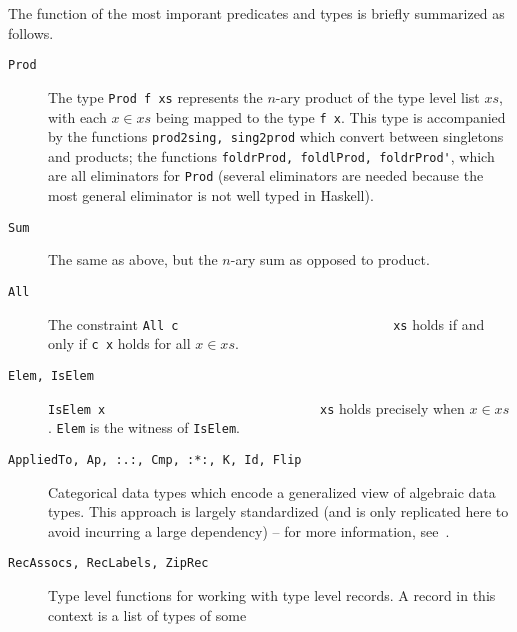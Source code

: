                         The function of the most imporant 
                        predicates and types is briefly summarized as follows. 
                        \begin{description}
                            \item[\texttt{Prod}] The type \lstinline{Prod f xs} 
                            represents the $n$-ary product of the type
                            level list $xs$, with each $x \in xs$ being mapped 
                            to the type \lstinline{f x}. This 
                            type is accompanied by the functions 
                            \lstinline{prod2sing, sing2prod} which convert
                            between singletons and products; the functions 
                            \lstinline{foldrProd, foldlProd, foldrProd'}, 
                            which are all eliminators for \lstinline{Prod} 
                            (several eliminators are needed because the 
                            most general eliminator is not well typed in 
                            Haskell). 
                            \item[\texttt{Sum}] The same as above, but the 
                            $n$-ary sum as opposed to product. 
                            \item[\texttt{All}] The constraint \lstinline{All c 
                            xs} holds if and only if \lstinline{c x} holds for 
                            all $x \in xs$. 
                            \item[\texttt{Elem, IsElem}] \lstinline{IsElem x 
                            xs} holds precisely when $x \in xs$. 
                            \lstinline{Elem} is the witness of 
                            \lstinline{IsElem}. 
                            \item[\texttt{AppliedTo, Ap, :.:, Cmp, :*:, K, Id, 
                            Flip}] Categorical data types which encode
                            a generalized view of algebraic data types. This 
                            approach is largely standardized (and is only
                            replicated here to avoid incurring a large 
                            dependency) -- for more information, 
                            see~\cite{alacarte}. 
                            \item[\texttt{RecAssocs, RecLabels, ZipRec}] Type 
                            level functions for working with type level 
                            records. 
                            A record in this context is a list of types of some 

\end{description}
